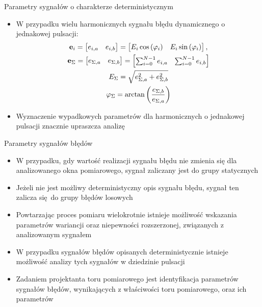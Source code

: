 \documentclass[12pt, polish, aspectratio = 169]{beamer}
\begin{document}
\begin{frame}{Parametry sygnałów o charakterze deterministycznym}
\begin{itemize}
\item W przypadku wielu harmonicznych sygnału błędu dynamicznego o jednakowej pulsacji:
\begin{gather}
\mathbf{e}_{i} =
\begin{bmatrix}
e_{i,a} & e_{i,b}
\end{bmatrix}
=
\begin{bmatrix}
E_{i} \cos \left(\varphi_{i}\right) & E_{i} \sin \left(\varphi_{i}\right)
\end{bmatrix}
\label{eq:dyn_vect}, \\
\mathbf{e}_{\Sigma} =
\begin{bmatrix}
e_{\Sigma,a} & e_{\Sigma,b}
\end{bmatrix}
=
\begin{bmatrix}
\sum _{i = 0} ^{N-1} e_{i,a} & \sum _{i = 0} ^{N-1} e_{i,b}
\end{bmatrix}
\label{eq:dyn_vect_sum} \\
E_{\Sigma} = \sqrt{e_{\Sigma,a}^{2} + e_{\Sigma,b}^{2}} \label{eq:dyn_vect_amp} \\
\varphi_{\Sigma} = \arctan \left(\frac{e_{\Sigma,b}}{e_{\Sigma,a}}\right) \label{eq:dyn_vect_phi}
\end{gather}
\item Wyznaczenie wypadkowych parametrów dla harmonicznych o jednakowej pulsacji znacznie upraszcza analizę
\end{itemize}
\end{frame}

\begin{frame}{Parametry sygnałów błędów}
\begin{itemize}
\item W przypadku, gdy wartość realizacji sygnału błędu nie zmienia się dla analizowanego okna pomiarowego, sygnał zaliczany jest do grupy statycznych
\item Jeżeli nie jest możliwy deterministyczny opis sygnału błędu, sygnał ten zalicza się do grupy błędów losowych
\item Powtarzając proces pomiaru wielokrotnie istnieje możliwość wskazania parametrów wariancji oraz niepewności rozszerzonej, związanych z analizowanym sygnałem
\item W przypadku sygnałów błędów opisanych deterministycznie istnieje możliwość analizy tych sygnałów w dziedzinie pulsacji
\item Zadaniem projektanta toru pomiarowego jest identyfikacja parametrów sygnałów błędów, wynikających z właściwości toru pomiarowego, oraz ich parametrów
\end{itemize}
\end{frame}
\end{document}

